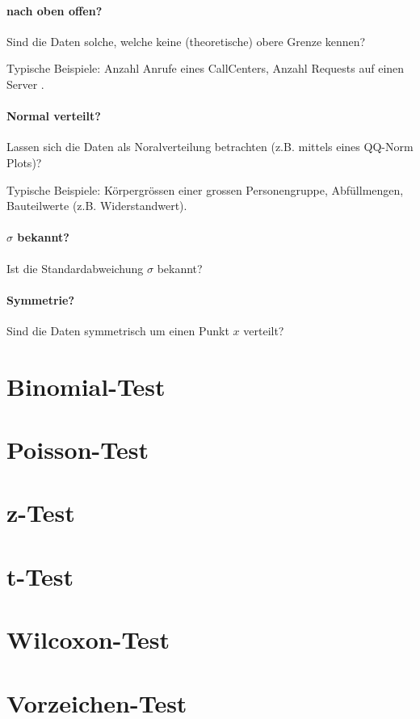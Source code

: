 \paragraph{nach oben offen?}
Sind die Daten solche, welche keine (theoretische) obere Grenze kennen?

Typische Beispiele: Anzahl Anrufe eines CallCenters, Anzahl Requests auf 
einen Server .

\paragraph{Normal verteilt?}
Lassen sich die Daten als Noralverteilung betrachten 
(z.B. mittels eines QQ-Norm Plots)?

Typische Beispiele: Körpergrössen einer grossen Personengruppe,
Abfüllmengen, Bauteilwerte (z.B. Widerstandwert). 

\paragraph{$\sigma$ bekannt?}
Ist die Standardabweichung $\sigma$ bekannt?

\paragraph{Symmetrie?}
Sind die Daten symmetrisch um einen Punkt $x$ verteilt?


\newpage
\section{Binomial-Test}
\section{Poisson-Test}
\section{z-Test}
\section{t-Test}
\section{Wilcoxon-Test}
\section{Vorzeichen-Test}
